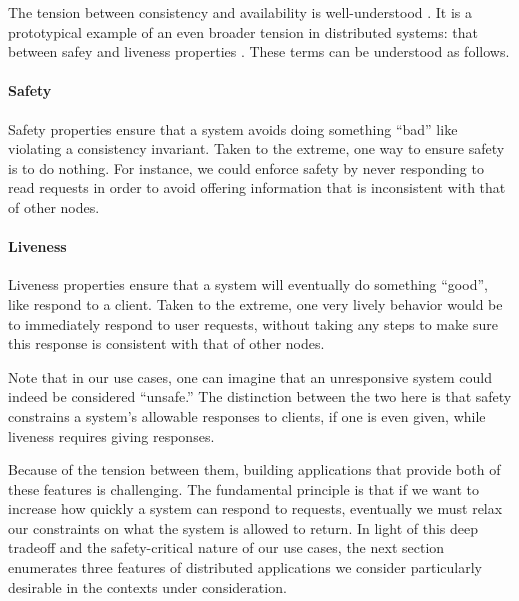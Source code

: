 The tension between consistency and availability is well-understood
\cite{10.1145/5505.5508}. It is a prototypical example of an even
broader tension in distributed systems: that between safey and
liveness properties \cite{2012perspectivesCAP}. These terms can be
understood as follows.

\paragraph{Safety}
Safety properties ensure that a system avoids doing something ``bad''
like violating a consistency invariant. Taken to the extreme, one way
to ensure safety is to do nothing. For instance, we could enforce
safety by never responding to read requests in order to avoid offering
information that is inconsistent with that of other nodes.

\paragraph{Liveness}
Liveness properties ensure that a system will eventually do something
``good'', like respond to a client. Taken to the extreme, one very
lively behavior would be to immediately respond to user requests,
without taking any steps to make sure this response is consistent with
that of other nodes.

Note that in our use cases, one can imagine that an unresponsive
system could indeed be considered ``unsafe.'' The distinction between
the two here is that safety constrains a system's allowable responses
to clients, if one is even given, while liveness requires giving
responses.

Because of the tension between them, building applications that
provide both of these features is challenging. The fundamental
principle is that if we want to increase how quickly a system can
respond to requests, eventually we must relax our constraints on what
the system is allowed to return. In light of this deep tradeoff and
the safety-critical nature of our use cases, the next section
enumerates three features of distributed applications we consider
particularly desirable in the contexts under consideration.
